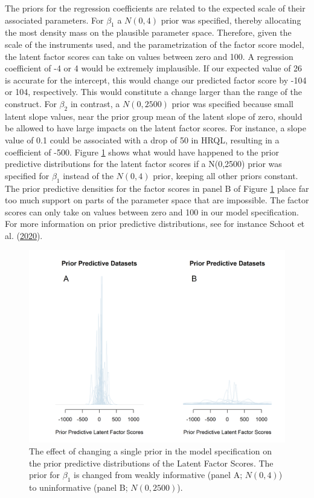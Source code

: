 \documentclass[openright,titlepage,12pt,a4paper]{book}
\begin{document}
The priors for the regression coefficients are related to the expected scale of their associated parameters. For \(\beta_1\) a \(N(0,4)\) prior was specified, thereby allocating the most density mass on the plausible parameter space. Therefore, given the scale of the instruments used, and the parametrization of the factor score model, the latent factor scores can take on values between zero and 100. A regression coefficient of -4 or 4 would be extremely implausible. If our expected value of 26 is accurate for the intercept, this would change our predicted factor score by -104 or 104, respectively. This would constitute a change larger than the range of the construct.
For \(\beta_2\) in contrast, a \(N(0, 2500)\) prior was specified because small latent slope values, near the prior group mean of the latent slope of zero, should be allowed to have large impacts on the latent factor scores. For instance, a slope value of 0.1 could be associated with a drop of 50 in HRQL, resulting in a coefficient of -500. Figure \ref{fig:ch05fig2} shows what would have happened to the prior predictive distributions for the latent factor scores if a N(0,2500) prior was specified for \(\beta_1\) instead of the \(N(0, 4)\) prior, keeping all other priors constant. The prior predictive densities for the factor scores in panel B of Figure \ref{fig:ch05fig2} place far too much support on parts of the parameter space that are impossible. The factor scores can only take on values between zero and 100 in our model specification. For more information on prior predictive distributions, see for instance Schoot et al. (\protect\hyperlink{ref-van_de_schoot_tutorial_2020}{2020}).

\begin{figure}[H]

{\centering \includegraphics[width=0.9\linewidth]{figures/chapter_5/Figure2} 

}

\caption{The effect of changing a single prior in the model specification on the prior predictive distributions of the Latent Factor Scores. The prior for $\beta_1$ is changed from weakly informative (panel A; $N(0,4)$) to uninformative (panel B; $N(0,2500)$). }\label{fig:ch05fig2}
\end{figure}
\end{document}
